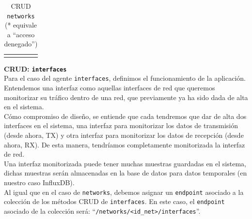 \documentclass[a4paper, oneside, 12pt]{book}
\begin{document}
\begin{table}[h!]
{\begin{tabular}{lllll}
				&                                                                                                      &                                                                                     &                                                                                                          &                                                                                   
			\end{tabular}%
		}
		\caption{CRUD \texttt{networks} (* equivale a ``acceso denegado'')}
		\label{tab:crud networks}
	\end{table}

	\vspace{22px}

	\noindent \textbf{\large CRUD: \texttt{interfaces}} \\
	
	\noindent Para el caso del agente \texttt{interfaces}, definimos el funcionamiento de la aplicación. Entendemos una interfaz como aquellas interfaces de red que queremos monitorizar su tráfico dentro de una red, que previamente ya ha sido dada de alta en el sistema. \\
	
	\noindent Cómo compromiso de diseño, se entiende que cada tendremos que dar de alta dos interfaces en el sistema, una interfaz para monitorizar los datos de transmisión (desde ahora, TX) y otra interfaz para monitorizar los datos de recepción (desde ahora, RX). De esta manera, tendríamos completamente monitorizada la interfaz de red. \\
	
	\noindent Una interfaz monitorizada puede tener muchas muestras guardadas en el sistema, dichas muestras serán almacenadas en la base de datos para datos temporales (en nuestro caso InfluxDB). \\
	
	\noindent Al igual que en el caso de \texttt{networks}, debemos asignar un \texttt{endpoint} asociado a la colección de los métodos CRUD de \texttt{interfaces}. En este caso, el \texttt{endpoint} asociado de la colección será: ``\texttt{/networks/<id\_net>/interfaces}''. \\
	
\end{document}
